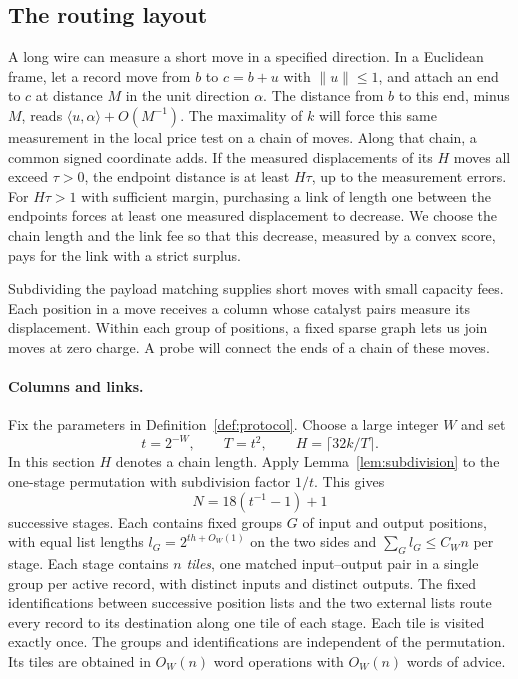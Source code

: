 

\subsection{The routing layout}

A long wire can measure a short move in a specified direction.
In a Euclidean frame, let a record move from \(b\) to \(c=b+u\)
with \(\|u\|\le1\), and attach an end to \(c\) at distance \(M\) in the
unit direction \(\alpha\). The distance from \(b\) to this end, minus
\(M\), reads \(\langle u,\alpha\rangle+O(M^{-1})\).
The maximality of \(k\) will force this same measurement in the local
price test on a chain of moves. Along that chain, a common signed
coordinate adds. If the measured displacements of its \(H\) moves
all exceed \(\tau>0\), the endpoint distance is at least \(H\tau\), up
to the measurement errors. For \(H\tau>1\) with sufficient margin,
purchasing a link of length one between the endpoints forces at least
one measured displacement to decrease. We choose the chain length and
the link fee so that this decrease, measured by a convex score, pays
for the link with a strict surplus.

Subdividing the payload matching supplies short moves with small capacity
fees. Each position in a move receives a column whose catalyst pairs
measure its displacement. Within each group of positions, a fixed
sparse graph lets us join moves at zero charge. A probe will connect the
ends of a chain of these moves.



\paragraph{Columns and links.}
Fix the parameters in Definition~\ref{def:protocol}. Choose a large
integer \(W\) and set
\[
       t=2^{-W},\qquad T=t^2,\qquad H=\lceil 32 k/T\rceil .
\]
In this section \(H\) denotes a chain length. Apply Lemma~\ref{lem:subdivision} to the one-stage permutation with
subdivision factor $1/t$. This gives
\[
                    N=18(t^{-1}-1)+1
\]
successive stages. Each contains fixed groups \(G\) of input and output
positions, with equal list lengths \(l_G=2^{th+O_W(1)}\) on the two sides
and \(\sum_G l_G\le C_W n\) per stage. Each stage contains \(n\)
\emph{tiles}, one matched input--output pair in a single group per active
record, with distinct inputs and distinct outputs. The fixed
identifications between successive position lists and the two external
lists route every record to its destination along one tile of each stage.
Each tile is visited exactly once. The groups and identifications are
independent of the permutation. Its tiles are obtained in \(O_W(n)\) word
operations with \(O_W(n)\) words of advice.


